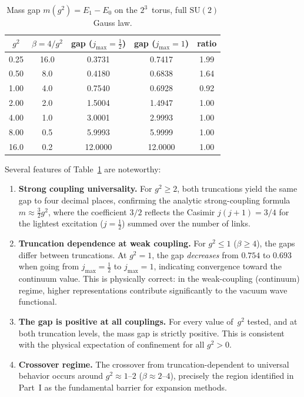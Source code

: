 \documentclass[12pt,a4paper]{article}
\newcommand{\half}{\tfrac{1}{2}}
\begin{document}
\begin{table}[ht]
\centering
\caption{Mass gap $m(g^2)=E_1-E_0$ on the $2^3$~torus, full $\mathrm{SU}(2)$ Gauss law.}
\label{tab:su2gap}
\begin{tabular}{@{}ccccc@{}}
\toprule
$g^2$ & $\beta=4/g^2$ & gap ($j_{\max}{=}\half$) & gap ($j_{\max}{=}1$) & ratio \\
\midrule
0.25 & 16.0 & 0.3731 & 0.7417 & 1.99 \\
0.50 &  8.0 & 0.4180 & 0.6838 & 1.64 \\
1.00 &  4.0 & 0.7540 & 0.6928 & 0.92 \\
2.00 &  2.0 & 1.5004 & 1.4947 & 1.00 \\
4.00 &  1.0 & 3.0001 & 2.9993 & 1.00 \\
8.00 &  0.5 & 5.9993 & 5.9999 & 1.00 \\
16.0 &  0.2 & 12.0000 & 12.0000 & 1.00 \\
\bottomrule
\end{tabular}
\end{table}

\noindent Several features of Table~\ref{tab:su2gap} are noteworthy:

\begin{enumerate}[label=(\roman*)]
\item \textbf{Strong coupling universality.} For $g^2\ge 2$, both truncations yield the same gap to four decimal places, confirming the analytic strong-coupling formula $m\approx \frac{3}{2}g^2$, where the coefficient $3/2$ reflects the Casimir $j(j+1)=3/4$ for the lightest excitation ($j=\half$) summed over the number of links.

\item \textbf{Truncation dependence at weak coupling.} For $g^2\le 1$ ($\beta\ge 4$), the gaps differ between truncations. At $g^2=1$, the gap \emph{decreases} from $0.754$ to $0.693$ when going from $j_{\max}=\half$ to $j_{\max}=1$, indicating convergence toward the continuum value. This is physically correct: in the weak-coupling (continuum) regime, higher representations contribute significantly to the vacuum wave functional.

\item \textbf{The gap is positive at all couplings.} For every value of~$g^2$ tested, and at both truncation levels, the mass gap is strictly positive. This is consistent with the physical expectation of confinement for all $g^2>0$.

\item \textbf{Crossover regime.} The crossover from truncation-dependent to universal behavior occurs around $g^2\approx 1$--$2$ ($\beta\approx 2$--$4$), precisely the region identified in Part~I as the fundamental barrier for expansion methods.
\end{enumerate}
\end{document}
